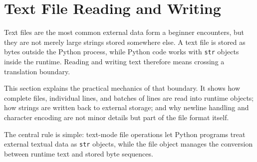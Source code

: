 \section{Text File Reading and Writing}

Text files are the most common external data form a beginner encounters, but they are not merely large strings stored somewhere else. A text file is stored as bytes outside the Python process, while Python code works with \texttt{str} objects inside the runtime. Reading and writing text therefore means crossing a translation boundary.

This section explains the practical mechanics of that boundary. It shows how complete files, individual lines, and batches of lines are read into runtime objects; how strings are written back to external storage; and why newline handling and character encoding are not minor details but part of the file format itself.

The central rule is simple: text-mode file operations let Python programs treat external textual data as \texttt{str} objects, while the file object manages the conversion between runtime text and stored byte sequences.